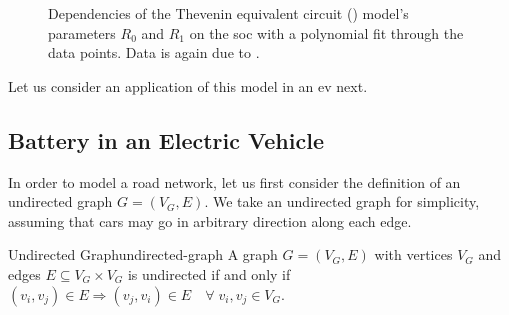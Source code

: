 \documentclass{prettytex/ox/mmsc-special-topic}
\begin{document}
  \begin{figure}[H]
    \captionsetup[subfigure]{justification=centering}
    \centering
    \hfill
    \par
    \caption{Dependencies of the Thevenin equivalent circuit () model's parameters $R_0$ and $R_1$ on the \gls{soc} with a polynomial fit through the data points. Data is again due to \cite{panasonicnums}.}
    \label{fig:parameters}
  \end{figure}

  Let us consider an application of this model in an \glsdesc{ev} next.

  \subsection{Battery in an Electric Vehicle}
  In order to model a road network, let us first consider the definition of an undirected graph $G = (V_G, E)$. We take an undirected graph for simplicity, assuming that cars may go in arbitrary direction along each edge.
  \begin{definition}{Undirected Graph}{undirected-graph}
    A graph $G = (V_G, E)$ with vertices $V_G$ and edges $E \subseteq V_G \times V_G$ is undirected if and only if $(v_i, v_j) \in E \Rightarrow (v_j, v_i) \in E \quad \forall\; v_i, v_j \in V_G$.
  \end{definition}
\end{document}
